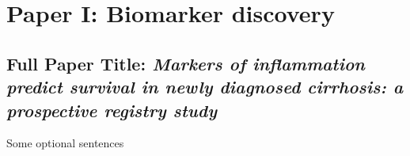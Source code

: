 \chapter{Paper I: Biomarker discovery}
\label{chap:Paper1}
\vspace{4cm}

\section*{\textbf{Full Paper Title:} \textit{Markers of inflammation predict
		survival in newly diagnosed
		cirrhosis: a prospective registry
		study} }

Some optional sentences

\label{paper:seasonality}

% 


